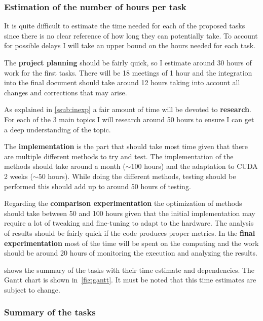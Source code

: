\subsubsection{Estimation of the number of hours per task}

It is quite difficult to estimate the time needed for each of the proposed tasks
since there is no clear reference of how long they can potentially take. To
account for possible delays I will take an upper bound on the hours needed for
each task.

The \textbf{project planning} should be fairly quick, so I estimate around 30
hours of work for the first tasks. There will be 18 meetings of 1 hour and the
integration into the final document should take around 12 hours taking into
account all changes and corrections that may arise.

As explained in \cref{ssub:inexp} a fair amount of time will be devoted to
\textbf{research}. For each of the 3 main topics I will research around 50 hours
to ensure I can get a deep understanding of the topic.

The \textbf{implementation} is the part that should take most time given that
there are multiple different methods to try and test. The implementation of the
methods should take around a month ($\sim100$ hours) and the adaptation to CUDA 2
weeks ($\sim 50$ hours). While doing the different methods, testing should be performed
this should add up to around 50 hours of testing.

Regarding the \textbf{comparison experimentation} the optimization of methods
should take between 50 and 100 hours given that the initial implementation may
require a lot of tweaking and fine-tuning to adapt to the hardware. The analysis
of results should be fairly quick if the code produces proper metrics. In the
\textbf{final experimentation} most of the time will be spent on the computing
and the work should be around 20 hours of monitoring the execution and analyzing
the results.

 shows the summary of the tasks with their time estimate
and dependencies. The Gantt chart is shown in~\cref{fig:gantt}. It must be noted
that this time estimates are subject to change.

\subsubsection{Summary of the tasks}

